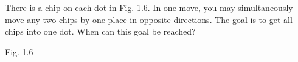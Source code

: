 There is a chip on each dot in Fig. 1.6. In one move, you may simultaneously move any two chips by one place in opposite directions. The goal is to get all chips into one dot. When can this goal be reached?
\begin{center}

Fig. 1.6
\end{center}
